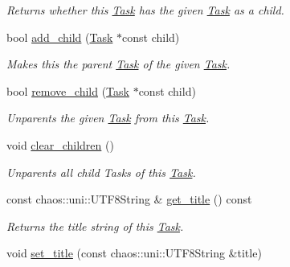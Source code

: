\begin{DoxyCompactItemize}
\begin{DoxyCompactList}\small\item\em Returns whether this \hyperlink{classsigma_1_1core_1_1tasks_1_1_task}{Task} has the given \hyperlink{classsigma_1_1core_1_1tasks_1_1_task}{Task} as a child. \end{DoxyCompactList}\item 
bool \hyperlink{classsigma_1_1core_1_1tasks_1_1_task_abac88c4ddaf54ae20aab497e95023f9e}{add\-\_\-child} (\hyperlink{classsigma_1_1core_1_1tasks_1_1_task}{Task} $\ast$const child)
\begin{DoxyCompactList}\small\item\em Makes this the parent \hyperlink{classsigma_1_1core_1_1tasks_1_1_task}{Task} of the given \hyperlink{classsigma_1_1core_1_1tasks_1_1_task}{Task}. \end{DoxyCompactList}\item 
bool \hyperlink{classsigma_1_1core_1_1tasks_1_1_task_a9df7e8a262b51b440cc6a45dbe219810}{remove\-\_\-child} (\hyperlink{classsigma_1_1core_1_1tasks_1_1_task}{Task} $\ast$const child)
\begin{DoxyCompactList}\small\item\em Unparents the given \hyperlink{classsigma_1_1core_1_1tasks_1_1_task}{Task} from this \hyperlink{classsigma_1_1core_1_1tasks_1_1_task}{Task}. \end{DoxyCompactList}\item 
void \hyperlink{classsigma_1_1core_1_1tasks_1_1_task_acb08acc571c5e0678d27d52a18a7db5e}{clear\-\_\-children} ()
\begin{DoxyCompactList}\small\item\em Unparents all child Tasks of this \hyperlink{classsigma_1_1core_1_1tasks_1_1_task}{Task}. \end{DoxyCompactList}\item 
\hypertarget{classsigma_1_1core_1_1tasks_1_1_task_a8fd41c73909654ee57670b45c273a65b}{const chaos\-::uni\-::\-U\-T\-F8\-String \& \hyperlink{classsigma_1_1core_1_1tasks_1_1_task_a8fd41c73909654ee57670b45c273a65b}{get\-\_\-title} () const }\label{classsigma_1_1core_1_1tasks_1_1_task_a8fd41c73909654ee57670b45c273a65b}

\begin{DoxyCompactList}\small\item\em Returns the title string of this \hyperlink{classsigma_1_1core_1_1tasks_1_1_task}{Task}. \end{DoxyCompactList}\item 
\hypertarget{classsigma_1_1core_1_1tasks_1_1_task_a1f17b3e1f7b444d6a73f5391e929adc5}{void \hyperlink{classsigma_1_1core_1_1tasks_1_1_task_a1f17b3e1f7b444d6a73f5391e929adc5}{set\-\_\-title} (const chaos\-::uni\-::\-U\-T\-F8\-String \&title)}\label{classsigma_1_1core_1_1tasks_1_1_task_a1f17b3e1f7b444d6a73f5391e929adc5}


\end{DoxyCompactItemize}
